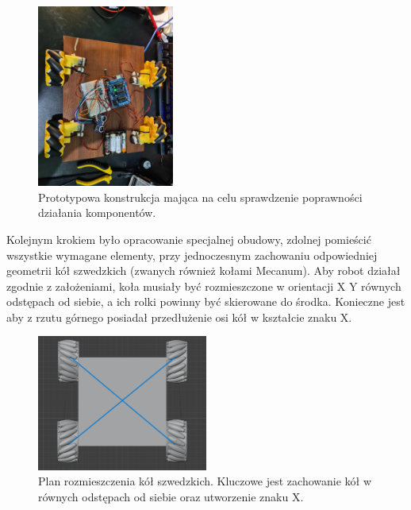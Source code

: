 \documentclass{report}
\begin{document}
\begin{figure}[H]
    \centering
    \includegraphics*[width=0.4\textwidth]{"src/Robot_pics/Build_1.jpg"}
    \caption{Prototypowa konstrukcja mająca na celu sprawdzenie poprawności działania komponentów.}
    \label{fig:bt_con_arduino}
\end{figure}

Kolejnym krokiem było opracowanie specjalnej obudowy, zdolnej pomieścić wszystkie wymagane elementy, przy jednoczesnym zachowaniu odpowiedniej geometrii kół szwedzkich (zwanych również kołami Mecanum). 
Aby robot działał zgodnie z założeniami, koła musiały być rozmieszczone w orientacji X Y równych odstępach od siebie, a ich rolki powinny być skierowane do środka. Konieczne jest aby z rzutu górnego posiadał przedłużenie osi kół w kształcie znaku X. 


\begin{figure}[H]
    \centering
    \includegraphics*[width=0.5\textwidth]{"src/Robot_pics/Mecanum_lines.png"}
    \caption{Plan rozmieszczenia kół szwedzkich. Kluczowe jest zachowanie kół w równych odstępach od siebie oraz utworzenie znaku X.}
    \label{fig:bt_con_arduino}
\end{figure}
\end{document}
